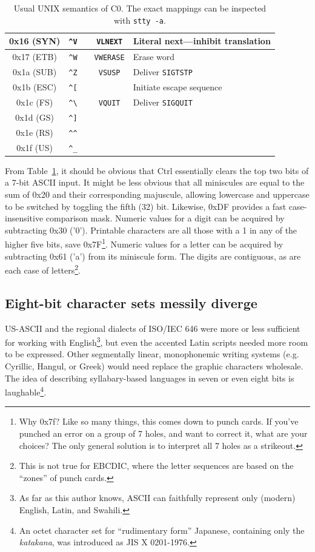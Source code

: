 \begin{table}[!htb]
\begin{tabular}{ |c|c|c|c|l| }
    \hline
    0x16 (SYN) & \texttt{\^{}V} & & \texttt{VLNEXT} & Literal next---inhibit translation\\
    \hline
    0x17 (ETB) & \texttt{\^{}W} & & \texttt{VWERASE} & Erase word \\
    \hline
    0x1a (SUB) & \texttt{\^{}Z} & & \texttt{VSUSP} & Deliver \texttt{SIGTSTP} \\
    \hline
    0x1b (ESC) & \texttt{\^{}[} & & & Initiate escape sequence \\
    \hline
    0x1c (FS) & \texttt{\^{}\textbackslash{}} & & \texttt{VQUIT} & Deliver \texttt{SIGQUIT} \\
    \hline
    0x1d (GS) & \texttt{\^{}]} & & & \\
    \hline
    0x1e (RS) & \texttt{\^{}\^{}} & & & \\
    \hline
    0x1f (US) & \texttt{\^{}\_} & & & \\
    \hline
  \end{tabular}
  \caption[Usual UNIX semantics of C0]{Usual UNIX semantics of C0. The exact mappings can be inspected with \texttt{stty -a}.}
  \label{table:c0maps}
\end{table}

From Table~\ref{table:c0maps}, it should be obvious that Ctrl essentially clears
the top two bits of a 7-bit ASCII input. It might be less obvious that all
miniscules are equal to the sum of 0x20 and their corresponding majuscule,
allowing lowercase and uppercase to be switched by toggling the fifth (32) bit.
Likewise, 0xDF provides a fast case-insensitive comparison mask. Numeric values
for a digit can be acquired by subtracting 0x30 ('0'). Printable characters are all
those with a 1 in any of the higher five bits, save 0x7F\footnote{Why 0x7f? Like
so many things, this comes down to punch cards. If you've punched an error on
a group of 7 holes, and want to correct it, what are your choices? The only
general solution is to interpret all 7 holes as a strikeout\cite{cardpunch}.}. Numeric values for a
letter can be acquired by subtracting 0x61 ('a') from its miniscule form. The
digits are contiguous, as are each case of letters\footnote{This is not true for
EBCDIC, where the letter sequences are based on the ``zones'' of punch cards\cite{nickgammon}.}.

\subsection{Eight-bit character sets messily diverge}
US-ASCII and the regional dialects of ISO/IEC 646 were more or less sufficient
for working with English\footnote{As far as this author knows, ASCII
can faithfully represent only (modern) English, Latin, and Swahili.}, but even
the accented Latin scripts needed more room to be expressed. Other
segmentally linear, monophonemic writing systems (e.g. Cyrillic, Hangul, or
Greek) would need replace the graphic characters wholesale. The idea of
describing syllabary-based languages in seven or even eight bits is
laughable\footnote{An octet character set for ``rudimentary form'' Japanese,
containing only the \textit{katakana}, was introduced as JIS X 0201-1976.}.

